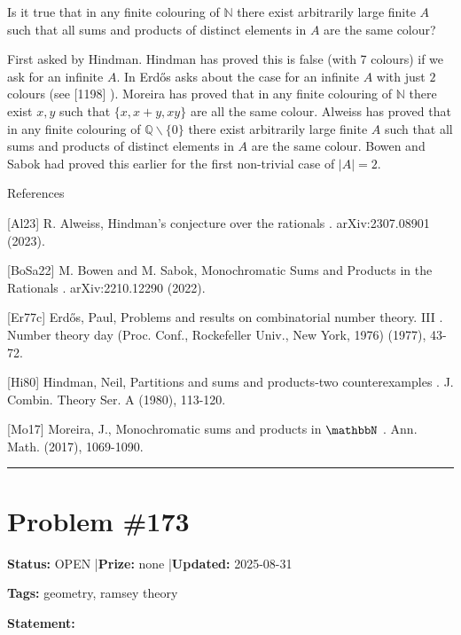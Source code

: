 \documentclass{article}
\begin{document}
Is it true that in any finite colouring of $\mathbb{N}$ there exist arbitrarily large finite $A$ such that all sums and products of distinct elements in $A$ are the same colour?




First asked by Hindman. Hindman \cite{Hi80} has proved this is false (with 7 colours) if we ask for an infinite $A$. In \cite{Er77c} Erd\H{o}s asks about the case for an infinite $A$ with just $2$ colours (see [1198] ). Moreira \cite{Mo17} has proved that in any finite colouring of $\mathbb{N}$ there exist $x,y$ such that $\{x,x+y,xy\}$ are all the same colour. Alweiss \cite{Al23} has proved that in any finite colouring of $\mathbb{Q}\backslash \{0\}$ there exist arbitrarily large finite $A$ such that all sums and products of distinct elements in $A$ are the same colour. Bowen and Sabok \cite{BoSa22} had proved this earlier for the first non-trivial case of $\lvert A\rvert=2$.




References

[Al23] R. Alweiss, Hindman's conjecture over the rationals . arXiv:2307.08901 (2023).

[BoSa22] M. Bowen and M. Sabok, Monochromatic Sums and Products in the Rationals . arXiv:2210.12290 (2022).

[Er77c] Erd\H{o}s, Paul, Problems and results on combinatorial number theory. III . Number theory day (Proc. Conf., Rockefeller Univ., New York, 1976) (1977), 43-72.

[Hi80] Hindman, Neil, Partitions and sums and products-two counterexamples . J. Combin. Theory Ser. A (1980), 113-120.

[Mo17] Moreira, J., Monochromatic sums and products in $\mathbbN$ . Ann. Math. (2017), 1069-1090.

\noindent\rule{\linewidth}{0.4pt}


\section{Problem \#173}
\label{prob:173}

\noindent\textbf{Status:} OPEN \quad|\quad \textbf{Prize:} none \quad|\quad \textbf{Updated:} 2025-08-31

\noindent\textbf{Tags:} geometry, ramsey theory

\medskip

\noindent\textbf{Statement:}
\end{document}

